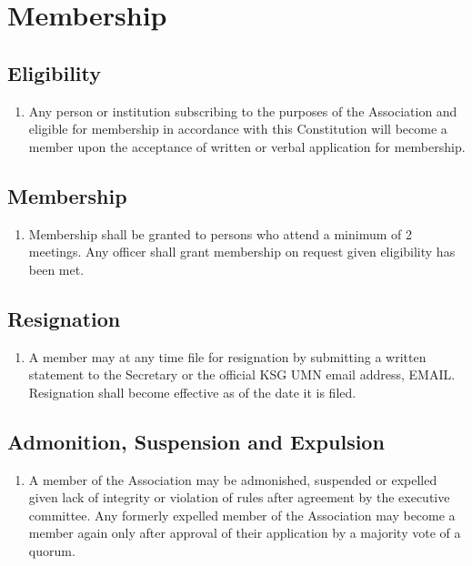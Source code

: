 \documentclass[12pt,letterpaper]{article}
\begin{document}
\section{Membership}

\subsection{Eligibility}
\begin{enumerate}
  \item Any person or institution subscribing to the purposes of the Association
        and eligible for membership in accordance with this Constitution will
        become a member upon the acceptance of written or verbal application
        for membership.
\end{enumerate}

\subsection{Membership}
\begin{enumerate}
  \item Membership shall be granted to persons who attend a minimum of 2 meetings.
        Any officer shall grant membership on request given eligibility has been met.
\end{enumerate}

\subsection{Resignation}
\begin{enumerate}
  \item A member may at any time file for resignation by submitting a written
        statement to the Secretary or the official KSG UMN email address,
        EMAIL. Resignation shall become effective as of the date it is filed.
\end{enumerate}

\subsection{Admonition, Suspension and Expulsion}
\begin{enumerate}
  \item A member of the Association may be admonished, suspended or expelled
        given lack of integrity or violation of rules after agreement by
        the executive committee. Any formerly expelled member of the Association
        may become a member again only after approval of their application by
        a majority vote of a quorum.
\end{enumerate}
\end{document}
